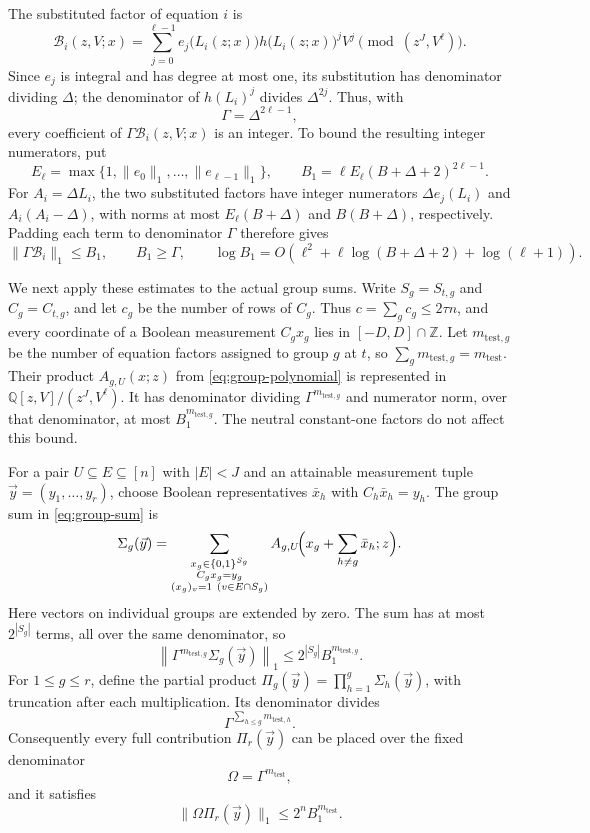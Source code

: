 \documentclass[11pt,reqno]{amsart}
\numberwithin{equation}{section}
\theoremstyle{definition}\newtheorem{definition}[theorem]{Definition}
\theoremstyle{remark}\newtheorem{remark}[theorem]{Remark}
\renewcommand{\le}{\leqslant}
\renewcommand{\ge}{\geqslant}
\begin{document}
The substituted factor of equation $i$ is
\[
 \mathcal B_i(z,V;x)=\sum_{j=0}^{\ell-1}
       e_j\bigl(L_i(z;x)\bigr)h\bigl(L_i(z;x)\bigr)^jV^j
       \pmod{(z^J,V^\ell)}.
\]
Since $e_j$ is integral and has degree at most one, its substitution
has denominator dividing $\Delta$; the denominator of
$h(L_i)^j$ divides $\Delta^{2j}$. Thus, with
\[
 \Gamma=\Delta^{2\ell-1},
\]
every coefficient of $\Gamma\mathcal B_i(z,V;x)$ is an integer.
To bound the resulting integer numerators, put
\[
 E_\ell=\max\{1,\|e_0\|_1,\ldots,\|e_{\ell-1}\|_1\},\qquad
 B_1=\ell E_\ell(B+\Delta+2)^{2\ell-1}.
\]
For $A_i=\Delta L_i$, the two substituted factors have integer
numerators $\Delta e_j(L_i)$ and $A_i(A_i-\Delta)$, with norms at most
$E_\ell(B+\Delta)$ and $B(B+\Delta)$, respectively. Padding each term
to denominator $\Gamma$ therefore gives
\[
 \|\Gamma\mathcal B_i\|_1\le B_1,\qquad B_1\ge\Gamma,
 \qquad
 \log B_1=O\!\left(\ell^2+
       \ell\log(B+\Delta+2)+\log(\ell+1)\right).
\]

We next apply these estimates to the actual group sums.
Write $S_g=S_{t,g}$ and $C_g=C_{t,g}$, and let $c_g$ be the number
of rows of $C_g$. Thus $c=\sum_g c_g\le2\tau n$, and every coordinate
of a Boolean measurement $C_gx_g$ lies in $[-D,D]\cap\mathbb Z$.
Let $m_{\mathrm{test},g}$ be the number of equation factors assigned
to group $g$ at $t$, so $\sum_g m_{\mathrm{test},g}=m_{\mathrm{test}}$.
Their product $A_{g,U}(x;z)$ from \eqref{eq:group-polynomial} is
represented in $\mathbb Q[z,V]/(z^J,V^\ell)$. It has denominator
dividing $\Gamma^{m_{\mathrm{test},g}}$ and numerator norm, over that
denominator, at most $B_1^{m_{\mathrm{test},g}}$. The neutral
constant-one factors do not affect this bound.

For a pair $U\subseteq E\subseteq[n]$ with $|E|<J$ and an attainable
measurement tuple $\vec y=(y_1,\ldots,y_r)$, choose Boolean representatives
$\bar x_h$ with $C_h\bar x_h=y_h$. The group sum in
\eqref{eq:group-sum} is
\[
 \Sigma_g(\vec y)=
 \sum_{\substack{x_g\in\{0,1\}^{S_g}\\ C_gx_g=y_g\\
                  (x_g)_v=1\ (v\in E\cap S_g)}}
 A_{g,U}\!\Bigl(x_g+\sum_{h\ne g}\bar x_h;z\Bigr).
\]
Here vectors on individual groups are extended by zero.
The sum has at most $2^{|S_g|}$ terms, all over the same denominator,
so
\[
 \left\|\Gamma^{m_{\mathrm{test},g}}\Sigma_g(\vec y)\right\|_1
 \le 2^{|S_g|}B_1^{m_{\mathrm{test},g}}.
\]
For $1\le g\le r$, define the partial product
$\Pi_g(\vec y)=\prod_{h=1}^g\Sigma_h(\vec y)$, with truncation after each
multiplication. Its denominator divides
\[
 \Gamma^{\sum_{h\le g}m_{\mathrm{test},h}}.
\]
Consequently every full contribution $\Pi_r(\vec y)$ can be placed over
the fixed denominator
\[
 \Omega=\Gamma^{m_{\mathrm{test}}},
\]
and it satisfies
\[
 \|\Omega\Pi_r(\vec y)\|_1
 \le2^nB_1^{m_{\mathrm{test}}}.
\]
\end{document}
